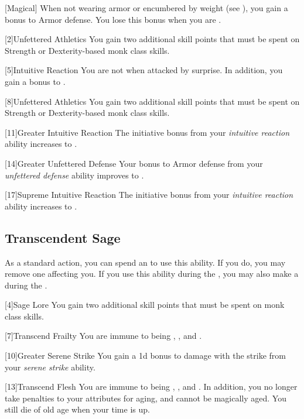         [Magical]
        When not wearing armor or encumbered by weight (see ), you gain a  bonus to Armor defense.
        You lose this bonus when you are \helpless.

        [2]{Unfettered Athletics} You gain two additional skill points that must be spent on Strength or Dexterity-based monk class skills.

        [5]{Intuitive Reaction}
        You are not \unaware when attacked by surprise.
        In addition, you gain a  bonus to .

        [8]{Unfettered Athletics} You gain two additional skill points that must be spent on Strength or Dexterity-based monk class skills.

        [11]{Greater Intuitive Reaction}
        The initiative bonus from your \textit{intuitive reaction} ability increases to .

        [14]{Greater Unfettered Defense}
        Your bonus to Armor defense from your \textit{unfettered defense} ability improves to .

        [17]{Supreme Intuitive Reaction}
        The initiative bonus from your \textit{intuitive reaction} ability increases to .

    \subsection{Transcendent Sage}

         As a standard action, you can spend an  to use this ability.
        If you do, you may remove one  affecting you.
        If you use this ability during the , you may also make a  during the .

        [4]{Sage Lore} You gain two additional skill points that must be spent on monk class skills.

        [7]{Transcend Frailty}
        You are immune to being , , and .

        [10]{Greater Serene Strike} You gain a \plus1d bonus to damage with the strike from your \textit{serene strike} ability.

        [13]{Transcend Flesh}
        You are immune to being , , and .
        In addition, you no longer take penalties to your attributes for aging, and cannot be magically aged.
        You still die of old age when your time is up.

